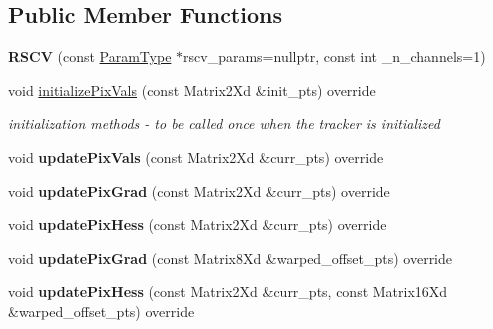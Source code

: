 \subsection*{Public Member Functions}
\begin{DoxyCompactItemize}
\item 
\hypertarget{classRSCV_a4c5dcb3dc794e158677589d49263d3fb}{{\bfseries R\-S\-C\-V} (const \hyperlink{structRSCVParams}{Param\-Type} $\ast$rscv\-\_\-params=nullptr, const int \-\_\-n\-\_\-channels=1)}\label{classRSCV_a4c5dcb3dc794e158677589d49263d3fb}

\item 
\hypertarget{classRSCV_a2a79fde7ad0058951421bbfa48a7b9e1}{void \hyperlink{classRSCV_a2a79fde7ad0058951421bbfa48a7b9e1}{initialize\-Pix\-Vals} (const Matrix2\-Xd \&init\-\_\-pts) override}\label{classRSCV_a2a79fde7ad0058951421bbfa48a7b9e1}

\begin{DoxyCompactList}\small\item\em initialization methods -\/ to be called once when the tracker is initialized \end{DoxyCompactList}\item 
\hypertarget{classRSCV_a8365016849b75ea8be1ec85606124ff3}{void {\bfseries update\-Pix\-Vals} (const Matrix2\-Xd \&curr\-\_\-pts) override}\label{classRSCV_a8365016849b75ea8be1ec85606124ff3}

\item 
\hypertarget{classRSCV_a6ec4d6d490360b6306c5956b260f7803}{void {\bfseries update\-Pix\-Grad} (const Matrix2\-Xd \&curr\-\_\-pts) override}\label{classRSCV_a6ec4d6d490360b6306c5956b260f7803}

\item 
\hypertarget{classRSCV_a1fe67b38c4f5da9ed8cfb3bb49235232}{void {\bfseries update\-Pix\-Hess} (const Matrix2\-Xd \&curr\-\_\-pts) override}\label{classRSCV_a1fe67b38c4f5da9ed8cfb3bb49235232}

\item 
\hypertarget{classRSCV_a4c9be8c70179afc0a5be0065a2fa066d}{void {\bfseries update\-Pix\-Grad} (const Matrix8\-Xd \&warped\-\_\-offset\-\_\-pts) override}\label{classRSCV_a4c9be8c70179afc0a5be0065a2fa066d}

\item 
\hypertarget{classRSCV_a91c1607794bc5fcc6509090a45553fca}{void {\bfseries update\-Pix\-Hess} (const Matrix2\-Xd \&curr\-\_\-pts, const Matrix16\-Xd \&warped\-\_\-offset\-\_\-pts) override}\label{classRSCV_a91c1607794bc5fcc6509090a45553fca}


\end{DoxyCompactItemize}
